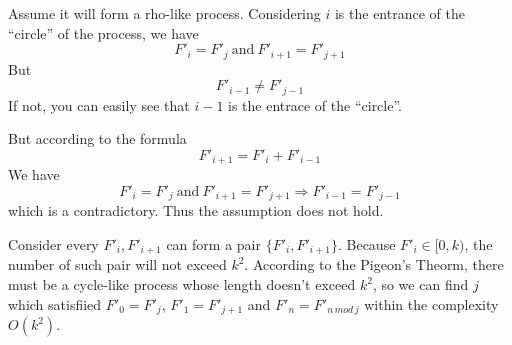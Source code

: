Assume it will form a rho-like process. Considering $i$ is the entrance of the ``circle'' of the process, we have
\[F'_i = F'_j~\text{and}~F'_{i+1}=F'_{j+1}\]
But
\[F'_{i-1} \neq F'_{j-1}\]
If not, you can easily see that $i-1$ is the entrace of the ``circle''.

\noindent But according to the formula
\[F'_{i+1}=F'_{i}+F'_{i-1}\]
We have
\[F'_i = F'_j~\text{and}~F'_{i+1}=F'_{j+1} \Rightarrow F'_{i-1} = F'_{j-1}\]
which is a contradictory. Thus the assumption does not hold.

Consider every $F'_{i}, F'_{i+1}$ can form a pair $\{F'_i, F'_{i+1}\}$.
Because $F'_{i} \in [0, k)$, the number of such pair will not exceed $k^2$.
According to the Pigeon's Theorm, there must be a cycle-like process whose length doesn't exceed $k^2$,
so we can find $j$ which satisfiied $F'_{0} = F'_{j}$, $F'_{1} = F'_{j+1}$ and $F'_{n} = F'_{n\,mod\,j}$ within the complexity $O(k^2)$.
